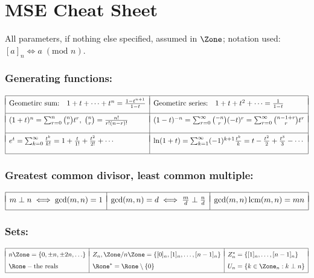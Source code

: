 \documentclass[a4paper]{article}
\begin{document}
\section*{MSE Cheat Sheet}

All parameters, if nothing else specified, assumed in $\Zone$;
notation used: $[a]_n \iff a\; (\mbox{mod } n)$.

\subsubsection*{Generating functions:} \vspace{-1.2em}%
\[
  \begin{array}[t]{|ll|ll|}
    \hline
    &&& \\[-9pt]
    \mbox{Geometirc sum:} & 1+t+\cdots+t^n = \frac{1-t^{n+1}}{1-t} &
    \mbox{Geometirc series:} & 1+t+t^2+\cdots = \frac{1}{1-t}
    \\[7pt]\hline
    &&& \\[-9pt]
    \multicolumn{2}{|l|}{(1+t)^n = \sum_{r=0}^{n} \binom nr t^r, \; \binom nr = \frac{n!}{r!(n-r)!}} &
    \multicolumn{2}{l|}{(1-t)^{-n} = \sum_{r=0}^{\infty} \binom {-n}r (-t)^r = \sum_{r=0}^{\infty}\binom {n-1+r}r t^r}
    \\[11pt]\hline
    &&& \\[-9pt]
    \multicolumn{2}{|l|}{e^t = \sum_{k=0}^{\infty} \frac{t^k}{k!} =  1 + \frac{t}{1!} + \frac{t^2}{2!} + \cdots}&
    \multicolumn{2}{l|}{\ln(1+t) = \sum_{k=1}^{\infty}(-1)^{k+1}\frac{t^k}{k} =  t - \frac{t^2}{2} + \frac{t^3}{3} - \cdots}
    \\[11pt]\hline

  \end{array}
\]%

\subsubsection*{Greatest common divisor, least common multiple:} \vspace{-1.2em}%
\[
  \begin{array}[t]{|*{3}{l|}}
    \hline
    && \\[-8pt]
    m\perp n \iff \gcd(m,n)=1 & \gcd(m,n) = d \iff \frac md\perp\frac nd & \gcd(m,n)\,\mbox{lcm}(m,n) = mn
 \\[6pt] \hline
  \end{array}
\]%

\subsubsection*{Sets:} \vspace{-2.5em} %
\[
  \begin{array}[t]{|*{3}{l|}}
 \hline
    && \\[-8pt]
   n\Zone = \{0,\pm n,\pm 2n,\ldots \}
 & Z_n,\Zone/n\Zone = \{[0]_n,[1]_n,\ldots,[n-1]_n\}
 & Z_n^* = \{[1]_n,\ldots,[n-1]_n\} \\[6pt]
   \Rone - \mbox{the reals}
 & \Rone^* = \Rone\setminus\{0\}
 & U_n = \{k\in\Zone_n: k\perp n\}
 \\[3pt] \hline
  \end{array}
\]%
\end{document}
